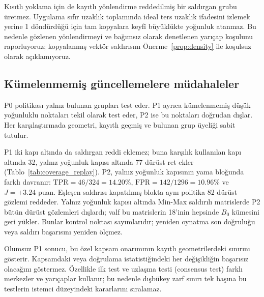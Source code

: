 \documentclass[journal]{IEEEtran}
\begin{document}
Kısıtlı yoklama için de kayıtlı yönlendirme reddedilmiş bir saldırgan grubu üretmez. Uygulama sıfır uzaklık toplamında ideal ters uzaklık ifadesini izlemek yerine 1 döndürdüğü için tam kopyalara keyfî büyüklükte yoğunluk atanmaz. Bu nedenle gözlenen yönlendirmeyi ve bağımsız olarak denetlenen yarıçap koşulunu raporluyoruz; kopyalanmış vektör saldırısını Önerme~\ref{prop:density} ile koşulsuz olarak açıklamıyoruz.

\subsection{Kümelenmemiş güncellemelere müdahaleler}

P0 politikası yalnız bulunan grupları test eder. P1 ayrıca kümelenmemiş düşük yoğunluklu noktaları tekil olarak test eder, P2 ise bu noktaları doğrudan dışlar. Her karşılaştırmada geometri, kayıtlı geçmiş ve bulunan grup üyeliği sabit tutulur.

P1 iki kapı altında da saldırgan reddi eklemez; buna karşılık kullanılan kapı altında 32, yalnız yoğunluk kapısı altında 77 dürüst ret ekler (Tablo~\ref{tab:coverage_replay}). P2, yalnız yoğunluk kapısının yama bloğunda farklı davranır: $\mathrm{TPR}=46/324=14.20\%$, $\mathrm{FPR}=142/1296=10.96\%$ ve $J=+3.24$ puan. Eşleşen saldırısı kapatılmış blokta aynı politika 82 dürüst gözlemi reddeder. Yalnız yoğunluk kapısı altında Min-Max saldırılı matrislerde P2 bütün dürüst gözlemleri dışlardı; valf bu matrislerin 18'inin hepsinde $B_0$ kümesini geri yükler. Bunlar kontrol noktası sayımlarıdır; yeniden oynatma son doğruluğu veya saldırı başarısını yeniden ölçmez.

Olumsuz P1 sonucu, bu özel kapsam onarımının kayıtlı geometrilerdeki sınırını gösterir. Kapsamdaki veya doğrulama istatistiğindeki her değişikliğin başarısız olacağını göstermez. Özellikle ilk test ve uzlaşma testi (consensus test) farklı merkezler ve yarıçaplar kullanır; bu nedenle dışbükey zarf sınırı tek başına bu testlerin istemci düzeyindeki kararlarını sıralamaz.
\end{document}
